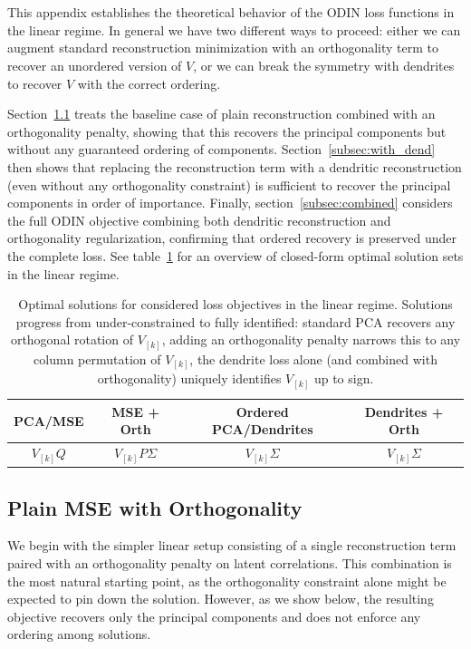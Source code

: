 \documentclass[twoside,11pt]{article}
\begin{document}



\section{}
\label{app:ODIN}
This appendix establishes the theoretical behavior of the ODIN loss functions in the linear regime. In general we have two different ways to proceed: either we can augment standard reconstruction minimization with an orthogonality term to recover an unordered version of $V$, or we can break the symmetry with dendrites to recover $V$ with the correct ordering. 

Section~\ref{subsec:no_dend} treats the baseline case of plain reconstruction combined with an orthogonality penalty, showing that this recovers the principal components but without any guaranteed ordering of components. Section~\ref{subsec:with_dend} then shows that replacing the reconstruction term with a dendritic reconstruction (even without any orthogonality constraint) is sufficient to recover the principal components in order of importance. Finally, section~\ref{subsec:combined} considers the full ODIN objective combining both dendritic reconstruction and orthogonality regularization, confirming that ordered recovery is preserved under the complete loss. See table~\ref{tab:solutions} for an overview of closed-form optimal solution sets in the linear regime.

\begin{table}[]
    \centering
    \begin{tabular}{|c|c|c|c|}
    \hline
        PCA/MSE & MSE + Orth & Ordered PCA/Dendrites & Dendrites + Orth\\
        \hline
         $V_{[k]}Q$& $V_{[k]}P\Sigma $& 
         $V_{[k]}\Sigma$ &$V_{[k]}\Sigma$\\ 
    \hline
    \end{tabular}
    \caption{Optimal solutions for considered loss objectives in the linear regime. Solutions progress from under-constrained to fully identified: standard PCA recovers any orthogonal rotation of $V_{[k]}$, adding an orthogonality penalty narrows this to any column permutation of $V_{[k]}$, the dendrite loss alone (and combined with orthogonality) uniquely identifies $V_{[k]}$ up to sign.}
    \label{tab:solutions}
\end{table}


\subsection{Plain MSE with Orthogonality}
\label{subsec:no_dend}
We begin with the simpler linear setup consisting of a single reconstruction term paired with an orthogonality penalty on latent correlations. This combination is the most natural starting point, as the orthogonality constraint alone might be expected to pin down the solution. However, as we show below, the resulting objective recovers only the principal components and does not enforce any ordering among solutions.
\end{document}
